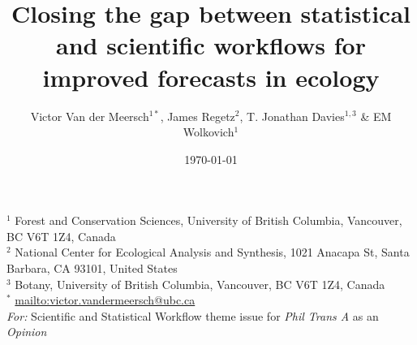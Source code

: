 \documentclass[11pt]{article}
\begin{document}
\title{Closing the gap between statistical and scientific workflows for improved forecasts in ecology} 
\date{\today}
\author{Victor Van der Meersch$^{1*}$, James Regetz$^{2}$, T. Jonathan Davies$^{1,3}$ \& EM Wolkovich$^{1}$}
\maketitle
\noindent $^{1}$ Forest and Conservation Sciences, University of British Columbia, Vancouver, BC V6T 1Z4, Canada\\
$^{2}$ National Center for Ecological Analysis and Synthesis, 1021 Anacapa St, Santa Barbara, CA 93101, United States\\
$^{3}$ Botany, University of British Columbia, Vancouver, BC V6T 1Z4, Canada \\
$^{*}$ \url{mailto:victor.vandermeersch@ubc.ca}\\

\noindent \emph{For:} Scientific and Statistical Workflow theme issue for \emph{Phil Trans A} as an \emph{Opinion}
\end{document}
